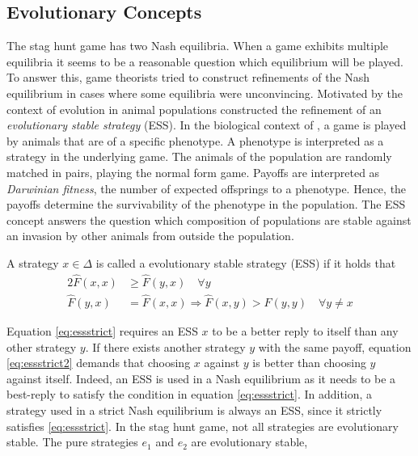 \subsection{Evolutionary Concepts}
The stag hunt game has two Nash equilibria. When a game exhibits 
multiple equilibria it seems to be a reasonable question 
which equilibrium will be played. To answer this, 
game theorists tried to construct refinements 
of the Nash equilibrium in cases where some equilibria were unconvincing. 
Motivated by the context of evolution in animal populations 
\textcite{smith_lhe_1973} constructed the refinement of an 
\textit{evolutionary stable strategy} (ESS).  
In the biological context of \textcite{smith_lhe_1973}, a game is played 
by animals that are of a specific phenotype. A phenotype is interpreted
as a strategy in the underlying game. The animals of the population are randomly
matched in pairs, playing the normal form game. Payoffs are interpreted as
\textit{Darwinian fitness}, the number of expected offsprings to a phenotype.
Hence, the payoffs determine the survivability of the phenotype in the 
population.
The ESS concept answers the question which composition of populations are
stable against an invasion by other animals from outside the population.
\begin{mydef}
        \label{def:ess}
        A strategy $x \in \Delta$ is called a evolutionary stable strategy 
        (ESS) if it holds that
        \begin{alignat}{2}
                \label{eq:essstrict}
                \hat{F}(x,x) &\geq \hat{F}(y,x) \quad \forall y \\ 
                \hat{F}(y,x) &= \hat{F}(x,x) \Rightarrow  
                \hat{F}(x,y) > \hat{F}(y,y) \quad \forall y \neq x \label{eq:essstrict2}
        \end{alignat}
\end{mydef}
Equation \eqref{eq:essstrict}
requires an ESS $x$ to be a better reply to itself than any other strategy $y$.
If there exists another strategy $y$ with the same payoff, equation 
\eqref{eq:essstrict2} demands that choosing $x$ against $y$ is better 
than choosing $y$ against itself.
Indeed, an ESS is used in a 
Nash equilibrium as it needs to be a best-reply to satisfy the 
condition in equation \eqref{eq:essstrict}. 
In addition, a strategy used in a strict 
Nash equilibrium is always an ESS, since it strictly satisfies 
\eqref{eq:essstrict}. 
In the stag hunt game, not all strategies are evolutionary stable.
The pure strategies $e_1$ and $e_2$ are evolutionary stable,
